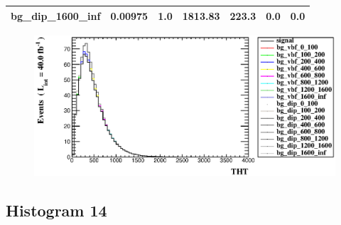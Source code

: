 \documentclass[a4paper, 10pt]{article}
\begin{document}
\begin{table}[H]
\begin{center}
\begin{tabular}{|m{23.0mm}|m{23.0mm}|m{18.0mm}|m{19.0mm}|m{19.0mm}|m{19.0mm}|m{19.0mm}|}
      \hline
      {\cellcolor{white}         bg\_dip\_1600\_inf}& {\cellcolor{white}         0.00975}& {\cellcolor{white}         1.0}& {\cellcolor{white}         1813.83}& {\cellcolor{white}         223.3}& {\cellcolor{green}         0.0}& {\cellcolor{green}         0.0}\\
\hline
    \end{tabular}
  \end{center}
\end{table}

\begin{figure}[H]
  \begin{center}
    \includegraphics[scale=0.45]{selection_12.eps}\\
\caption{   }
  \end{center}
\end{figure}
      \newpage
\subsection{ Histogram 14}
\end{document}
